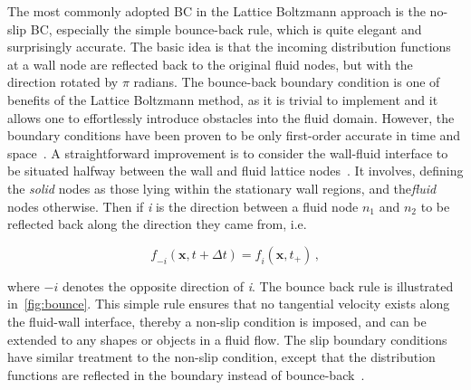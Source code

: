 The most commonly adopted BC in the Lattice Boltzmann approach is the no-slip 
BC, especially the simple bounce-back rule, which is quite elegant and 
surprisingly accurate. The basic idea is that the incoming distribution 
functions at a wall node are reflected back to the original fluid nodes, but 
with the direction rotated by $\pi$ radians. The bounce-back boundary condition 
is one of benefits of the Lattice Boltzmann method, as it is trivial to 
implement and it allows one to effortlessly introduce obstacles into the fluid 
domain. However, the boundary conditions have been proven to be only 
first-order accurate in time and space~\citep{Pan2006}. A straightforward 
improvement is to consider the wall-fluid interface to be situated halfway 
between the wall and fluid lattice nodes~\citep{Ziegler1993}. It involves, 
defining the \textit{solid} nodes as those lying within the stationary wall 
regions, and the\textit{fluid} nodes otherwise. Then if \textit{i} is the 
direction between a fluid node $\mathit{n}_{1}$ and $\mathit{n_2}$ to be 
reflected back along the direction they came from, i.e.

\begin{equation}
	\mathit{f}_{-\mathit{i}}(\mathbf{x}, \mathit{t}+\Delta \mathit{t}) = 
	\mathit{f_i}(\mathbf{x}, \mathit{t}_{+})\,,
\end{equation}

\noindent where $-\mathit{i}$ denotes the opposite direction of \textit{i}. The 
bounce back rule is illustrated in~\cref{fig:bounce}. This simple rule ensures 
that no tangential velocity exists along the fluid-wall interface, thereby a 
non-slip condition is imposed, and can be extended to any shapes or objects in 
a fluid flow. The slip boundary conditions have similar treatment to the 
non-slip condition, except that the distribution functions are reflected in the 
boundary instead of bounce-back~\citep{Succi2001}.


